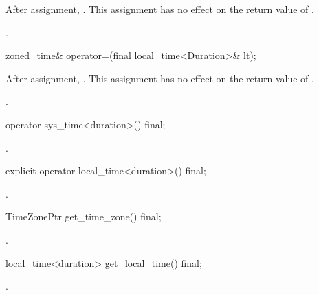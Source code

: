 \begin{itemdescr}
\pnum
\effects
After assignment, .
This assignment has no effect on the return value of .

\pnum
\returns {}.
\end{itemdescr}

%
\begin{itemdecl}
zoned_time& operator=(final local_time<Duration>& lt);
\end{itemdecl}

\begin{itemdescr}
\pnum
\effects
After assignment, .
This assignment has no effect on the return value of .

\pnum
\returns {}.
\end{itemdescr}

%
\begin{itemdecl}
operator sys_time<duration>() final;
\end{itemdecl}

\begin{itemdescr}
\pnum
\returns {}.
\end{itemdescr}

%
\begin{itemdecl}
explicit operator local_time<duration>() final;
\end{itemdecl}

\begin{itemdescr}
\pnum
\returns {}.
\end{itemdescr}

%
\begin{itemdecl}
TimeZonePtr get_time_zone() final;
\end{itemdecl}

\begin{itemdescr}
\pnum
\returns {}.
\end{itemdescr}

%
\begin{itemdecl}
local_time<duration> get_local_time() final;
\end{itemdecl}

\begin{itemdescr}
\pnum
\returns {}.
\end{itemdescr}

